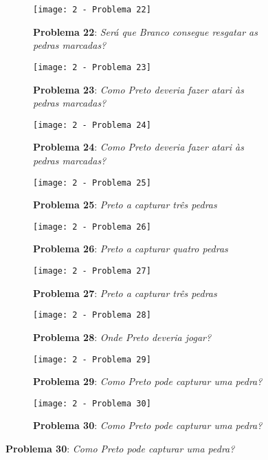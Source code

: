 \begin{figure}[p!]
    \centering
    \captionsetup{justification=raggedright,singlelinecheck=false}
    \begin{subfigure}[t]{.3\textwidth}
        \texttt{[image: 2 - Problema 22]}
        \caption*{\textbf{Problema 22}: \emph{Será que Branco consegue resgatar as pedras marcadas?}}
    \end{subfigure}
    \hfill
    \begin{subfigure}[t]{.3\textwidth}
        \texttt{[image: 2 - Problema 23]}
        \caption*{\textbf{Problema 23}: \emph{Como Preto deveria fazer atari às pedras marcadas?}}
    \end{subfigure}
    \hfill
    \begin{subfigure}[t]{.3\textwidth}
        \texttt{[image: 2 - Problema 24]}
        \caption*{\textbf{Problema 24}: \emph{Como Preto deveria fazer atari às pedras marcadas?}}
    \end{subfigure}
    \par\bigskip
    \begin{subfigure}[t]{.3\textwidth}
        \texttt{[image: 2 - Problema 25]}
        \caption*{\textbf{Problema 25}: \emph{Preto a capturar três pedras}}
    \end{subfigure}
    \hfill
    \begin{subfigure}[t]{.3\textwidth}
        \texttt{[image: 2 - Problema 26]}
        \caption*{\textbf{Problema 26}: \emph{Preto a capturar quatro pedras}}
    \end{subfigure}
    \hfill
    \begin{subfigure}[t]{.3\textwidth}
        \texttt{[image: 2 - Problema 27]}
        \caption*{\textbf{Problema 27}: \emph{Preto a capturar três pedras}}
    \end{subfigure}
    \par\bigskip
    \begin{subfigure}[t]{.3\textwidth}
        \texttt{[image: 2 - Problema 28]}
        \caption*{\textbf{Problema 28}: \emph{Onde Preto deveria jogar?}}
    \end{subfigure}
    \hfill
    \begin{subfigure}[t]{.3\textwidth}
        \texttt{[image: 2 - Problema 29]}
        \caption*{\textbf{Problema 29}: \emph{Como Preto pode capturar uma pedra?}}
    \end{subfigure}
    \hfill
    \begin{subfigure}[t]{.3\textwidth}
        \texttt{[image: 2 - Problema 30]}
        \caption*{\textbf{Problema 30}: \emph{Como Preto pode capturar uma pedra?}}
    \end{subfigure}
\end{figure}

